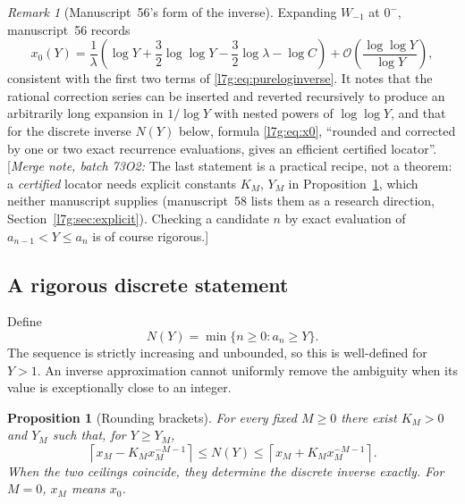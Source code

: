 \documentclass[11pt,letterpaper]{article}
\newtheorem{proposition}[theorem]{Proposition}
\theoremstyle{remark}\newtheorem{remark}[theorem]{Remark}
\newcommand{\bigO}{\mathcal O}\newcommand{\Ct}{C_{t}}
\newcommand{\mergenote}[1]{\textup{[}\emph{Merge note, batch 73O2:} #1\textup{]}}
\newcounter{l7gtrsavedeq}
\begin{document}
\begin{remark}[Manuscript~56's form of the inverse]\label{l7g:cm:rem:inverse}
Expanding $W_{-1}$ at $0^-$, manuscript~56 records
\begin{equation}\label{l7g:cm:eq:inverse-expanded}
 x_0(Y)=\frac{1}{\lambda}\left(
 \log Y+\frac32\log\log Y
 -\frac32\log \lambda-\log C\right)
 +\bigO\!\left(\frac{\log\log Y}{\log Y}\right),
\end{equation}
consistent with the first two terms of \eqref{l7g:eq:pureloginverse}.
It notes that the rational correction series can be inserted and reverted
recursively to produce an arbitrarily long expansion in $1/\log Y$ with
nested powers of $\log\log Y$, and that for the discrete inverse
$N(Y)$ below, formula \eqref{l7g:eq:x0}, ``rounded and corrected by one or
two exact recurrence evaluations, gives an efficient certified locator''.
\mergenote{The last statement is a practical recipe, not a theorem: a
\emph{certified} locator needs explicit constants $K_M$, $Y_M$ in
Proposition~\ref{l7g:prop:rounding}, which neither manuscript supplies
(manuscript~58 lists them as a research direction,
Section~\ref{l7g:sec:explicit}). Checking a candidate $n$ by exact
evaluation of $a_{n-1}<Y\le a_n$ is of course rigorous.}
\end{remark}

\subsection{A rigorous discrete statement}

Define
\[
 N(Y)=\min\{n\ge0:a_n\ge Y\}.
\]
The sequence is strictly increasing and unbounded, so this is well-defined
for $Y>1$. An inverse approximation cannot uniformly remove the
ambiguity when its value is exceptionally close to an integer.

\begin{proposition}[Rounding brackets]\label{l7g:prop:rounding}
For every fixed $M\ge0$ there exist $K_M>0$ and $Y_M$ such that, for
$Y\ge Y_M$,
\begin{equation}\label{l7g:eq:rounding}
 \left\lceil x_M-K_Mx_M^{-M-1}\right\rceil
 \le N(Y)\le
 \left\lceil x_M+K_Mx_M^{-M-1}\right\rceil.
\end{equation}
When the two ceilings coincide, they determine the discrete inverse
exactly. For $M=0$, $x_M$ means $x_0$.
\end{proposition}
\end{document}

